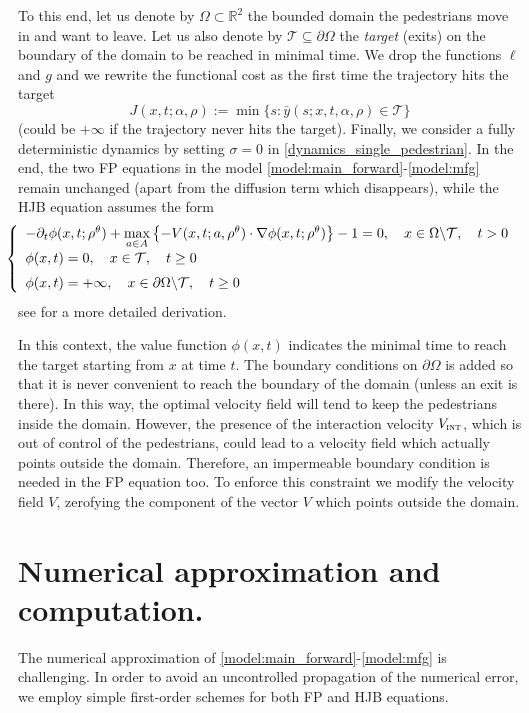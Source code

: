 \documentclass{cmslatex}
\newcommand{\R}{\mathbb{R}}
\newcommand{\rtheta}{\rho^\theta}
\newcommand{\Vi}{V_\textsc{int}}
\renewcommand{\r}{\rho}
\begin{document}
To this end, let us denote by $\Omega\subset\R^2$ the bounded domain the pedestrians move in and want to leave. Let us also denote by $\mathcal T\subseteq\partial\Omega$ the \emph{target} (exits) on the boundary of the domain to be reached in minimal time. 
We drop the functions $\ell$ and $g$ and we rewrite the functional cost as the first time the trajectory hits the target
\begin{equation}\label{def:Jmtp}
J(x,t;\alpha,\r):=\min\{s:\bar y(s;x,t,\alpha,\r)\in\mathcal T\}
\end{equation}
(could be $+\infty$ if the trajectory never hits the target).
Finally, we consider a fully deterministic dynamics by setting $\sigma=0$ in \eqref{dynamics_single_pedestrian}.
In the end, the two FP equations in the model \eqref{model:main_forward}-\eqref{model:mfg} remain unchanged (apart from the diffusion term which disappears), while the HJB equation assumes the form
\begin{equation}\label{HJB-mtp}
\hspace{-0.4cm}\left\{\begin{array}{l}
-\partial_t\phi(x,t;\rtheta) + \max\limits_{a\in A}\left\{-V(x,t;a,\rtheta)\cdot\nabla\phi(x,t;\rtheta)\right\}-1=0,\quad x\in\Omega\backslash\mathcal T, \quad t>0 \\ [2mm]
\phi(x,t)=0,\quad x\in\mathcal T, \quad t\geq 0 \\ [2mm]
\phi(x,t)=+\infty,\quad x\in\partial\Omega\backslash\mathcal T, \quad t\geq 0
\end{array}\right.
\end{equation}
see \cite[Sect.\ 4.4]{cristiani2014book} for a more detailed derivation.

In this context, the value function $\phi(x,t)$ indicates the minimal time to reach the target starting from $x$ at time $t$. The boundary conditions on $\partial\Omega$ is added so that it is never convenient to reach the boundary of the domain (unless an exit is there). 
In this way, the optimal velocity field will tend to keep the pedestrians inside the domain. 
However, the presence of the interaction velocity $\Vi$, which is out of control of the pedestrians, could lead to a velocity field which actually points outside the domain. Therefore, an impermeable boundary condition is needed in the FP equation too. 
To enforce this constraint we modify the velocity field $V$, zerofying the component of the vector $V$ which points outside the domain.
%
%
%
%
%

\section{Numerical approximation and computation.}\label{sec:numerics}
The numerical approximation of \eqref{model:main_forward}-\eqref{model:mfg} is challenging. 
In order to avoid an uncontrolled propagation of the numerical error,  we employ simple first-order schemes for both FP and HJB equations. 
\end{document}

